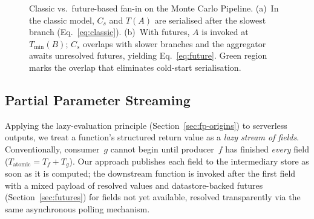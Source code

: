 \documentclass[runningheads]{llncs}
\begin{document}
\begin{figure}[t]
{%
}%
\caption{Classic vs.\ future-based fan-in on the Monte Carlo Pipeline. (a)~In the classic model, $C_s$ and $T(A)$ are serialised after the slowest branch (Eq.~\ref{eq:classic}). (b)~With futures, $A$ is invoked at $T_{\min}(B)$; $C_s$ overlaps with slower branches and the aggregator awaits unresolved futures, yielding Eq.~\eqref{eq:future}. Green region marks the overlap that eliminates cold-start serialisation.}
\label{fig:futures-workflow}
\end{figure}


\subsection{Partial Parameter Streaming}
\label{sec:streaming}

Applying the lazy-evaluation principle (Section~\ref{sec:fp-origins}) to serverless outputs, we treat a function's structured return value as a \emph{lazy stream of fields}. Conventionally, consumer~$g$ cannot begin until producer~$f$ has finished \emph{every} field ($T_{\text{atomic}} = T_f + T_g$). Our approach publishes each field to the intermediary store as soon as it is computed; the downstream function is invoked after the first field with a mixed payload of resolved values and datastore-backed futures (Section~\ref{sec:futures}) for fields not yet available, resolved transparently via the same asynchronous polling mechanism.
\end{document}
